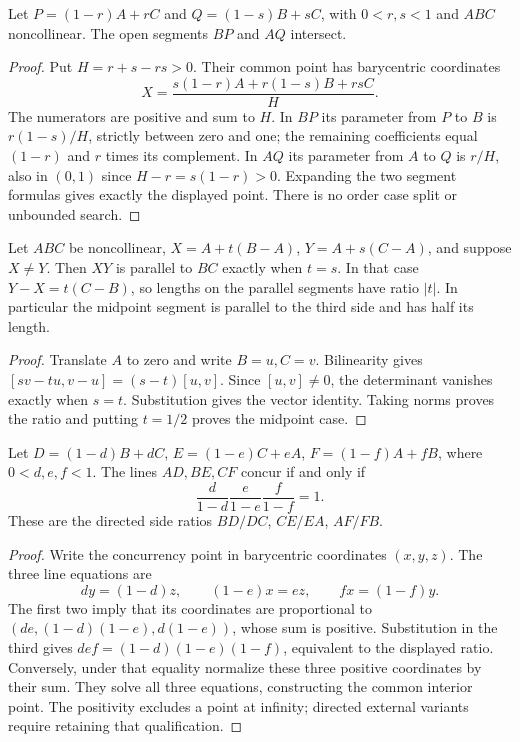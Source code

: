 \begin{theorem}
\label{aff:pasch}
Let $P=(1-r)A+rC$ and $Q=(1-s)B+sC$, with $0<r,s<1$ and $ABC$
noncollinear. The open segments $BP$ and $AQ$ intersect.
\end{theorem}
\begin{proof}
Put $H=r+s-rs>0$. Their common point has barycentric coordinates
\[
 X=\frac{s(1-r)A+r(1-s)B+rsC}{H}.
\]
The numerators are positive and sum to $H$. In $BP$ its parameter
from $P$ to $B$ is $r(1-s)/H$, strictly between zero and one; the
remaining coefficients equal $(1-r)$ and $r$ times its complement.
In $AQ$ its parameter from $A$ to $Q$ is $r/H$, also in $(0,1)$
since $H-r=s(1-r)>0$. Expanding the two segment formulas gives exactly
the displayed point. There is no order case split or unbounded search.
\end{proof}

\begin{theorem}\label{aff:intercept}
Let $ABC$ be noncollinear, $X=A+t(B-A)$, $Y=A+s(C-A)$, and suppose
$X\ne Y$. Then $XY$ is parallel to $BC$ exactly when $t=s$.
In that case $Y-X=t(C-B)$, so lengths on the parallel segments have
ratio $|t|$. In particular the midpoint segment is parallel to the
third side and has half its length.
\end{theorem}
\begin{proof}
Translate $A$ to zero and write $B=u,C=v$. Bilinearity gives
$[sv-tu,v-u]=(s-t)[u,v]$. Since $[u,v]\ne0$, the determinant
vanishes exactly when $s=t$. Substitution gives the vector identity.
Taking norms proves the ratio and putting $t=1/2$ proves the midpoint case.
\end{proof}

\begin{theorem}\label{aff:ceva}
Let $D=(1-d)B+dC$, $E=(1-e)C+eA$, $F=(1-f)A+fB$, where
$0<d,e,f<1$. The lines $AD,BE,CF$ concur if and only if
\[
 \frac d{1-d}\frac e{1-e}\frac f{1-f}=1.
\]
These are the directed side ratios $BD/DC$, $CE/EA$, $AF/FB$.
\end{theorem}
\begin{proof}
Write the concurrency point in barycentric coordinates $(x,y,z)$.
The three line equations are
\[
 dy=(1-d)z,\qquad (1-e)x=ez,\qquad fx=(1-f)y.
\]
The first two imply that its coordinates are proportional to
$(de,(1-d)(1-e),d(1-e))$, whose sum is positive. Substitution in the
third gives $def=(1-d)(1-e)(1-f)$, equivalent to the displayed ratio.
Conversely, under that equality normalize these three positive coordinates
by their sum. They solve all three equations, constructing the common
interior point. The positivity excludes a point at infinity; directed
external variants require retaining that qualification.
\end{proof}


